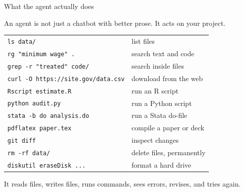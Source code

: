 \documentclass[aspectratio=169,11pt]{beamer}
\begin{document}
\begin{frame}[fragile]{What the agent actually does}

An agent is not just a chatbot with better prose. It acts on your project.

\vspace{0.05cm}

\begin{center}
\scriptsize
\begin{tabular}{ll}
\toprule
\texttt{ls data/} & list files \\
\texttt{rg "minimum wage" .} & search text and code \\
\texttt{grep -r "treated" code/} & search inside files \\
\texttt{curl -O https://site.gov/data.csv} & download from the web \\
\texttt{Rscript estimate.R} & run an R script \\
\texttt{python audit.py} & run a Python script \\
\texttt{stata -b do analysis.do} & run a Stata do-file \\
\texttt{pdflatex paper.tex} & compile a paper or deck \\
\texttt{git diff} & inspect changes \\
\textcolor{mitcardinal}{\texttt{rm -rf data/}} & \textcolor{mitcardinal}{delete files, permanently} \\
\textcolor{mitcardinal}{\texttt{diskutil eraseDisk ...}} & \textcolor{mitcardinal}{format a hard drive} \\
\bottomrule
\end{tabular}
\end{center}

\vspace{0.05cm}

\alert{It reads files, writes files, runs commands, sees errors, revises, and tries again.}

\end{frame}
\end{document}
